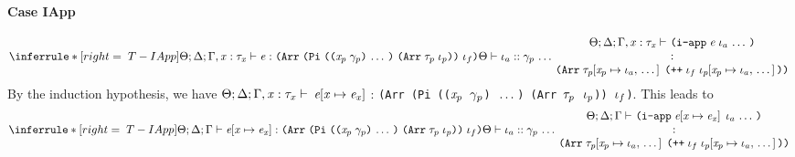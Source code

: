 \begin{sproof}
  \paragraph{Case {\sc IApp}}
  \[{\infr[T-IApp]
    {\typeof
      {\sEnv}{\kEnv}{\tEnv, \hastype{\var}{\type_{\var}}}
      {\expr}
      {\typearray{\typedprod{\sequence{\notevar{\var_p}{\sort_p}}}{\typearray{\type_p}{\idx_p}}}{\idx_f}}
      \\\\
      \sequence{\sortof{\sEnv}{\idx_a}{\sort_p}}}
    {\parbox{0.6\textwidth}
      {\centering
        \({\sEnv};{\kEnv};{\tEnv, \hastype{\var}{\type_{\var}}}\vdash\)
        \({\iapp{\expr}{\sequence{\idx_a}}}\)\\
        \(:{\typearray
          {\seqsubst{\type_p}{\var_p}{\idx_a}}
          {\idxappend{\idx_f\;\seqsubst{\idx_p}{\var_p}{\idx_a}}}}\)}}}\]
  By the induction hypothesis, we have
  ${\Theta};{\Delta};{\Gamma, \mathit{x} : \mathit{\tau}_{\mathit{x}}}\vdash$
  ${\mathit{e}\hspace{-2pt}\left[ \mathit{x} \mapsto \mathit{e}_{\mathit{x}} \right]}$ :
  {\tt (Arr (Pi (($\mathit{x}_p$ $\mathit{\gamma}_p$) $\, \ldots \,$) (Arr $\mathit{\tau}_p$ $\mathit{\iota}_p$)) $\mathit{\iota}_f$)}.
  This leads to
  \[{\infr[T-IApp]
    {\typeof
      {\sEnv}{\kEnv}{\tEnv}
      {\exprsubst{\expr}}
      {\typearray{\typedprod{\sequence{\notevar{\var_p}{\sort_p}}}{\typearray{\type_p}{\idx_p}}}{\idx_f}}
      \\\\
      \sequence{\sortof{\sEnv}{\idx_a}{\sort_p}}}
    {\parbox{0.6\textwidth}
      {\centering
        \({\sEnv};{\kEnv};{\tEnv}\vdash\)
        \({\iapp{\exprsubst{\expr}}{\sequence{\idx_a}}}\)\\
        \(:{\typearray
          {\seqsubst{\type_p}{\var_p}{\idx_a}}
          {\idxappend{\idx_f\;\seqsubst{\idx_p}{\var_p}{\idx_a}}}}\)}}}\]

\end{sproof}
